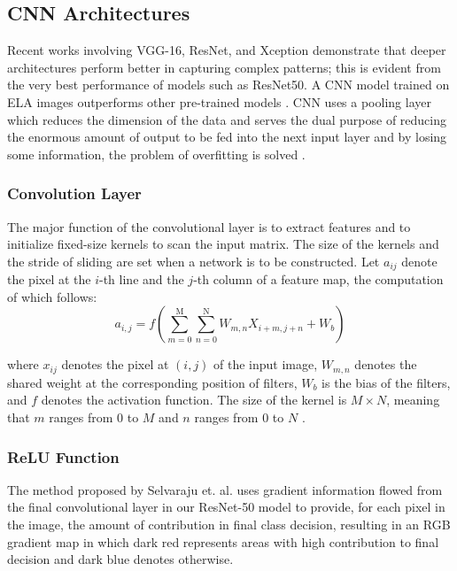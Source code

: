 \documentclass{ieeeaccess}
\begin{document}
\subsection{CNN Architectures} 
Recent works involving VGG-16, ResNet, and Xception demonstrate that deeper architectures perform better in capturing complex patterns; this is evident from the very best performance of models such as ResNet50. A CNN model trained on ELA images outperforms other pre-trained models \cite{9885600}. CNN uses a pooling layer which reduces the dimension of the data and serves the dual purpose of reducing the enormous amount of output to be fed into the next input layer and by losing some information, the problem of overfitting is solved \cite{9121083}.

\subsubsection{Convolution Layer}
The major function of the convolutional layer is to extract features and to initialize fixed-size kernels to scan the input matrix. The size of the kernels and the stride of sliding are set when a network is to be constructed.
Let \( a_{ij} \) denote the pixel at the \( i \)-th line and the \( j \)-th column of a feature map, the computation of which follows:
\begin{equation*} a_{i,j}=f(\sum_{m=0}^{\mathrm{M}}\sum_{n=0}^{\mathrm{N}}W_{m,n}X_{i+m,j+n}+W_{b}) \tag{1} \end{equation*}

where \( x_{ij} \) denotes the pixel at \((i, j)\) of the input image, \( W_{m,n} \) denotes the shared weight at the corresponding position of filters, \( W_{b} \) is the bias of the filters, and \( f \) denotes the activation function. The size of the kernel is \( M \times N \), meaning that \( m \) ranges from \( 0 \) to \( M \) and \( n \) ranges from \( 0 \) to \( N \) \cite{8456123}.


\subsubsection{ReLU Function}
The method proposed by Selvaraju et. al. \cite{selvaraju2016grad} uses gradient information flowed from the final convolutional layer in our ResNet-50 model to provide, for each pixel in the image, the amount of contribution in final class decision, resulting in an RGB gradient map in which dark red represents areas with high contribution to final decision and dark blue denotes otherwise.
\end{document}
